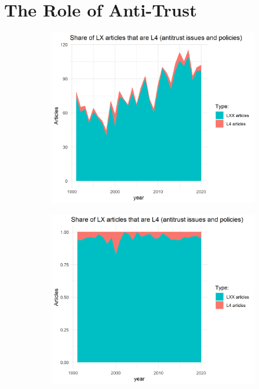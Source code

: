 \documentclass[11pt, letterpaper, twoside]{article}
\begin{document}
\newpage

\section{The Role of Anti-Trust}

\begin{figure}
    \begin{subfigure}[!htbp]{0.49\textwidth}
        \centering
        \includegraphics[width=\textwidth]{L4-vs-LXX.png}
    \end{subfigure}
    \hfill
    \begin{subfigure}[!htbp]{0.49\textwidth}
        \centering
        \includegraphics[width=\textwidth]{L4-vs-LXX-normalized.png}
    \end{subfigure}
\end{figure}
\end{document}

